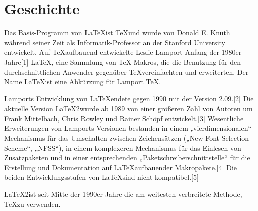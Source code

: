 
\chapter{Geschichte}

Das Basis-Programm von \LaTeX ist \TeX und wurde von Donald E. Knuth während seiner Zeit als Informatik-Professor an der Stanford University entwickelt. Auf \TeX aufbauend entwickelte Leslie Lamport Anfang der 1980er Jahre[1] \LaTeX, eine Sammlung von TeX-Makros, die die Benutzung für den durchschnittlichen Anwender gegenüber \TeX vereinfachten und erweiterten. Der Name \LaTeX ist eine Abkürzung für Lamport \TeX.

Lamports Entwicklung von \LaTeX endete gegen 1990 mit der Version 2.09.[2] Die aktuelle Version \LaTeX 2\epsilon wurde ab 1989 von einer größeren Zahl von Autoren um Frank Mittelbach, Chris Rowley und Rainer Schöpf entwickelt.[3] Wesentliche Erweiterungen von Lamports Versionen bestanden in einem „vierdimensionalen“ Mechanismus für das Umschalten zwischen Zeichensätzen („New Font Selection Scheme“, „NFSS“), in einem komplexeren Mechanismus für das Einlesen von Zusatzpaketen und in einer entsprechenden „Paketschreiberschnittstelle“ für die Erstellung und Dokumentation auf \LaTeX aufbauender Makropakete.[4] Die beiden Entwicklungsstufen von \LaTeX sind nicht kompatibel.[5]

\LaTeX 2\epsilon ist seit Mitte der 1990er Jahre die am weitesten verbreitete Methode, \TeX zu verwenden.